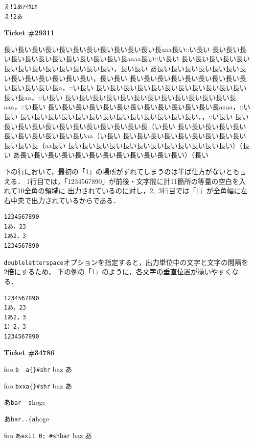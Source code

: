 \documentclass{ltjarticle}
\begin{document}
\begin{lstlisting}
え!1あｱｲｳｴｵ
え!2あ
\end{lstlisting}
\newpage
\textbf{Ticket \#29311}

\begin{env}{\relax}
長い長い長い長い長い長い長い長い長い長い長い長aaa長い::い長い
長い長い長い長い長い長い長い長い長い長い長い長aaaa長い::い長い
長い長い長い長い長い長い長い長い長い長い長い長い長い，長い長い
あ長い長い長い長い長い長い長い長い長い長い長い長い長い，長い長い
長い長い長い長い長い長い長い長い長い長い長い長い長a，::い長い
長い長い長い長い長い長い長い長い長い長い長い長い長aa，::い長い
長い長い長い長い長い長い長い長い長い長い長い長い長aaa，::い長い
長い長い長い長い長い長い長い長い長い長い長い長い長aaaa，::い長い
長い長い長い長い長い長い長い長い長い長い長い長い長い，，::い長い
長い長い長い長い長い長い長い長い長い長い長い長（い長い
長い長い長い長い長い長い長い長い長い長い長いaa（い長い
長い長い長い長い長い長い長い長い長い長い長い長（aa長い
長い長い長い長い長い長い長い長い長い長い長い長い）（長い
あ長い長い長い長い長い長い長い長い長い長い長い長い）（長い
\end{env}

下の行において，最初の「1」の場所がずれてしまうのは半ば仕方がないとも言える．
1行目では，「1234567890」が前後・文字間に計11箇所の等量の空白を入れて10全角の領域に
出力されているのに対し，2,~3行目では「1」が全角幅に左右中央で出力されているからである．
\begin{lstlisting}[basewidth=1em, basicstyle=\tt]
1234567890
1あ，23
1あ2，3
1234567890
\end{lstlisting}

\texttt{doubleletterspace}オプションを指定すると，出力単位中の文字と文字の間隔を2倍にするため，
下の例の「1」のように，各文字の垂直位置が揃いやすくなる．
\begin{lstlisting}[doubleletterspace, basewidth=1em, basicstyle=\tt]
1234567890
1あ，23
1あ2，3
1）2，3
1234567890
\end{lstlisting}


\newpage
\textbf{Ticket \#34786}

foo \lstinline[basicstyle=\tt]!b  a{}#shr! baz あ

foo \lstinline[basicstyle=\tt]!bxxa{}#shr! baz あ

あ\lstinline[basicstyle=\tt]{bar  s}hoge

あ\lstinline[basicstyle=\tt]{bar..{a}hoge

foo \lstinline[basicstyle=\tt\gtfamily]!あexit 0; #shbar! baz あ
\end{document}
